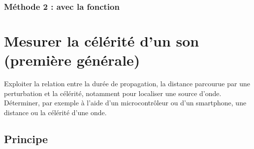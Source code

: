 \documentclass[a4paper,10pt,french]{book}
\begin{document}
\subsubsection{Méthode 2 : avec la fonction }
\label{\detokenize{4_lycee/2_seconde_emettre_son:methode-2-avec-la-fonction-tone}}
\begin{sphinxVerbatim}[commandchars=\\\{\}]
     



  

  
\end{sphinxVerbatim}


\section{Mesurer la célérité d’un son (première générale)}
\label{\detokenize{4_lycee/3_premiere_vitesse_son:mesurer-la-celerite-d-un-son-premiere-generale}}\label{\detokenize{4_lycee/3_premiere_vitesse_son::doc}}
\begin{sphinxShadowBox}

Exploiter la relation entre la durée de propagation, la distance parcourue par une perturbation et la célérité, notamment pour localiser une source d’onde. Déterminer, par exemple à l’aide d’un microcontrôleur ou d’un smartphone, une distance ou la célérité d’une onde.
\end{sphinxShadowBox}


\subsection{Principe}
\label{\detokenize{4_lycee/3_premiere_vitesse_son:principe}}
\end{document}
